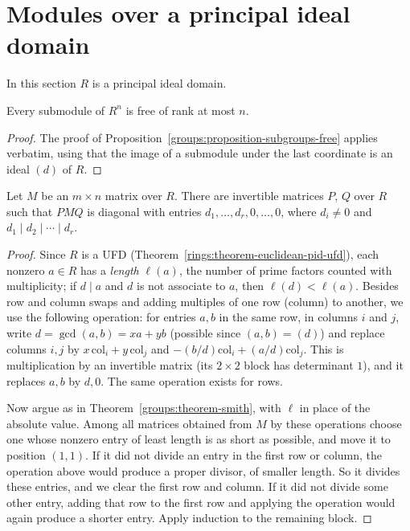 \section{Modules over a principal ideal domain}\label{rings:section-pid}

In this section $R$ is a principal ideal domain.

\begin{proposition}\label{rings:proposition-submodules-free}
Every submodule of $R^n$ is free of rank at most $n$.
\end{proposition}

\begin{proof}
The proof of Proposition~\ref{groups:proposition-subgroups-free} applies verbatim, using
that the image of a submodule under the last coordinate is an ideal $(d)$ of $R$.
\end{proof}

\begin{theorem}\label{rings:theorem-smith}
Let $M$ be an $m \times n$ matrix over $R$. There are invertible matrices $P$, $Q$ over $R$
such that $PMQ$ is diagonal with entries $d_1, \ldots, d_r, 0, \ldots, 0$, where
$d_i \neq 0$ and $d_1 \mid d_2 \mid \cdots \mid d_r$.
\end{theorem}

\begin{proof}
Since $R$ is a UFD (Theorem~\ref{rings:theorem-euclidean-pid-ufd}), each nonzero $a \in R$ has a
\emph{length} $\ell(a)$, the number of prime factors counted with multiplicity; if $d \mid a$
and $d$ is not associate to $a$, then $\ell(d) < \ell(a)$. Besides row and column swaps and
adding multiples of one row (column) to another, we use the following operation: for
entries $a, b$ in the same row, in columns $i$ and $j$, write $d = \gcd(a, b) = xa + yb$
(possible since $(a, b) = (d)$) and replace columns $i, j$ by
$x\,\mathrm{col}_i + y\,\mathrm{col}_j$ and $-(b/d)\mathrm{col}_i + (a/d)\mathrm{col}_j$. This is
multiplication by an invertible matrix (its $2 \times 2$ block has determinant $1$), and it
replaces $a, b$ by $d, 0$. The same operation exists for rows.

Now argue as in Theorem~\ref{groups:theorem-smith}, with $\ell$ in place of the absolute
value. Among all matrices obtained from $M$ by these operations choose one whose
nonzero entry of least length is as short as possible, and move it to position $(1,1)$.
If it did not divide an entry in the first row or column, the operation above would
produce a proper divisor, of smaller length. So it divides these entries, and we clear
the first row and column. If it did not divide some other entry, adding that row to the
first row and applying the operation would again produce a shorter entry. Apply
induction to the remaining block.
\end{proof}

